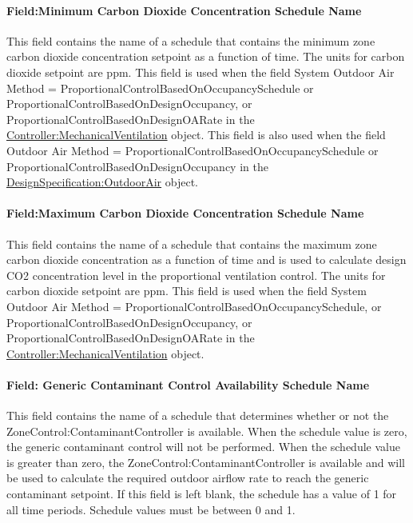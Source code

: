 \paragraph{Field:Minimum Carbon Dioxide Concentration Schedule Name}\label{fieldminimum-carbon-dioxide-concentration-schedule-name}

This field contains the name of a schedule that contains the minimum zone carbon dioxide concentration setpoint as a function of time. The units for carbon dioxide setpoint are ppm. This field is used when the field System Outdoor Air Method = ProportionalControlBasedOnOccupancySchedule or ProportionalControlBasedOnDesignOccupancy, or ProportionalControlBasedOnDesignOARate in the \hyperref[controllermechanicalventilation]{Controller:MechanicalVentilation} object. This field is also used when the field Outdoor Air Method = ProportionalControlBasedOnOccupancySchedule or ProportionalControlBasedOnDesignOccupancy in the \hyperref[designspecificationoutdoorair]{DesignSpecification:OutdoorAir} object.

\paragraph{Field:Maximum Carbon Dioxide Concentration Schedule Name}\label{fieldmaximum-carbon-dioxide-concentration-schedule-name}

This field contains the name of a schedule that contains the maximum zone carbon dioxide concentration as a function of time and is used to calculate design CO2 concentration level in the proportional ventilation control. The units for carbon dioxide setpoint are ppm. This field is used when the field System Outdoor Air Method = ProportionalControlBasedOnOccupancySchedule, or ProportionalControlBasedOnDesignOccupancy, or ProportionalControlBasedOnDesignOARate in the \hyperref[controllermechanicalventilation]{Controller:MechanicalVentilation} object.

\paragraph{Field: Generic Contaminant Control Availability Schedule Name}\label{field-generic-contaminant-control-availability-schedule-name}

This field contains the name of a schedule that determines whether or not the ZoneControl:ContaminantController is available. When the schedule value is zero, the generic contaminant control will not be performed. When the schedule value is greater than zero, the ZoneControl:ContaminantController is available and will be used to calculate the required outdoor airflow rate to reach the generic contaminant setpoint. If this field is left blank, the schedule has a value of 1 for all time periods. Schedule values must be between 0 and 1.

